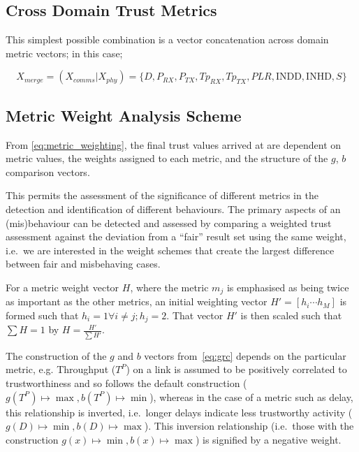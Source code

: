 \subsection{Cross Domain Trust Metrics}
This simplest possible combination is a vector concatenation across domain metric vectors; in this case; 

\begin{equation}
  X_{merge} =  (X_{comms}|X_{phy}) = \{D, P_{RX}, P_{TX}, Tp_{RX}, Tp_{TX}, PLR, \text{INDD}, \text{INHD}, S\}
	\label{eq:phys:vector}
\end{equation}


\subsection{Metric Weight Analysis Scheme}

From \eqref{eq:metric_weighting}, the final trust values arrived at are dependent on metric values, the weights assigned to each metric, and the structure of the $g$, $b$ comparison vectors.

This permits the assessment of the significance of different metrics in the detection and identification of different behaviours. 
The primary aspects of an (mis)behaviour can be detected and assessed by comparing a weighted trust assessment against the deviation from a ``fair'' result set using the same weight, i.e.\ we are interested in the weight schemes that create the largest difference between fair and misbehaving cases.

For a metric weight vector $H$, where the metric $m_j$ is emphasised as being twice as important as the other metrics, an initial weighting vector $H'=[h_i\cdots h_M]$ is formed such that $h_i = 1 \forall i \ne j; h_j=2$. That vector $H'$ is then scaled such that $\sum H = 1$ by $H= \frac{H'}{\sum H'}$.

The construction of the $g$ and $b$ vectors from~\autoref{eq:grc} depends on the particular metric, e.g. Throughput ($T^P$) on a link is assumed to be positively correlated to trustworthiness and so follows the default construction ($g(T^P) \mapsto \max, b(T^P) \mapsto \min$), whereas in the case of a metric such as delay, this relationship is inverted, i.e.\ longer delays indicate less trustworthy activity ($g(D) \mapsto \min, b(D) \mapsto \max$).
This inversion relationship (i.e.\ those with the construction $g(x) \mapsto \min, b(x) \mapsto \max$) is signified by a negative weight.

